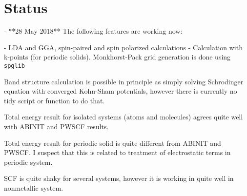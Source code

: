 \section{Status}

\begin{markdown}

- **28 May 2018** The following features are working now:
	
  - LDA and GGA, spin-paired and spin polarized calculations
  - Calculation with k-points (for periodic solids). Monkhorst-Pack grid
    generation is done using \texttt{spglib}
  
  Band structure calculation is possible in principle as simply solving
  Schrodinger equation with converged Kohn-Sham potentials, however there
  is currently no tidy script or function to do that.

  Total energy result for isolated systems (atoms and molecules) agrees quite
  well with ABINIT and PWSCF results.

  Total energy result for periodic solid is quite different from ABINIT and PWSCF.
  I suspect that this is related to treatment of electrostatic terms in periodic system.

  SCF is quite shaky for several systems, however it is working in quite well in nonmetallic
  system.

\end{markdown}
